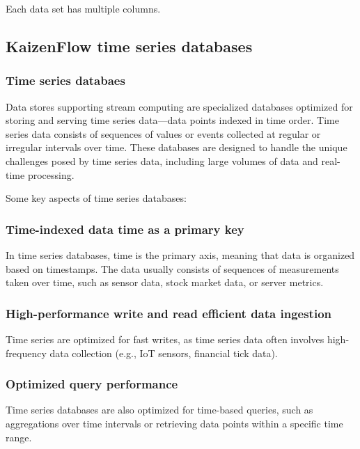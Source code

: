 \documentclass[11pt, reqno]{amsart}
\theoremstyle{definition}
\theoremstyle{remark}
\begin{document}
  Each data set has multiple columns.

  \subsection{KaizenFlow time series databases}

  \subsubsection{Time series databaes}
  Data stores supporting stream computing are specialized databases optimized for
  storing and serving time series data—data points indexed in time order. Time
  series data consists of sequences of values or events collected at regular or
  irregular intervals over time. These databases are designed to handle the unique
  challenges posed by time series data, including large volumes of data and real-time
  processing.

  Some key aspects of time series databases:

  \subsubsection{Time-indexed data time as a primary key}
  In time series databases, time is the primary axis, meaning that data is
  organized based on timestamps. The data usually consists of sequences of measurements
  taken over time, such as sensor data, stock market data, or server metrics.

  \subsubsection{High-performance write and read efficient data ingestion}
  Time series are optimized for fast writes, as time series data often involves high-frequency
  data collection (e.g., IoT sensors, financial tick data).

  \subsubsection{Optimized query performance}
  Time series databases are also optimized for time-based queries, such as aggregations
  over time intervals or retrieving data points within a specific time range.

\end{document}
